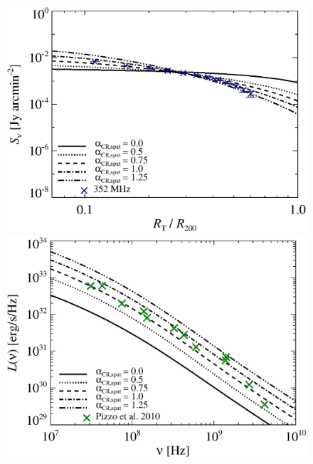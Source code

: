 \documentclass[fleqn,usenatbib,useAMS]{mnras}
\newcommand{\Mflatturb}{{\it M-turbulence}\xspace}
\begin{document}
\begin{figure}
\\
\begin{minipage}{1\columnwidth}
  \begin{center}%
    \includegraphics[width=\columnwidth]{prof.comp.KrTTDth.aCR.eps}
  \end{center}
\end{minipage}
\begin{minipage}{1\columnwidth}
   \begin{center}%
     \includegraphics[width=\columnwidth]{spec.comp.KrTTDth.aCR.eps}
   \end{center}
\end{minipage}

\end{figure}
\end{document}
